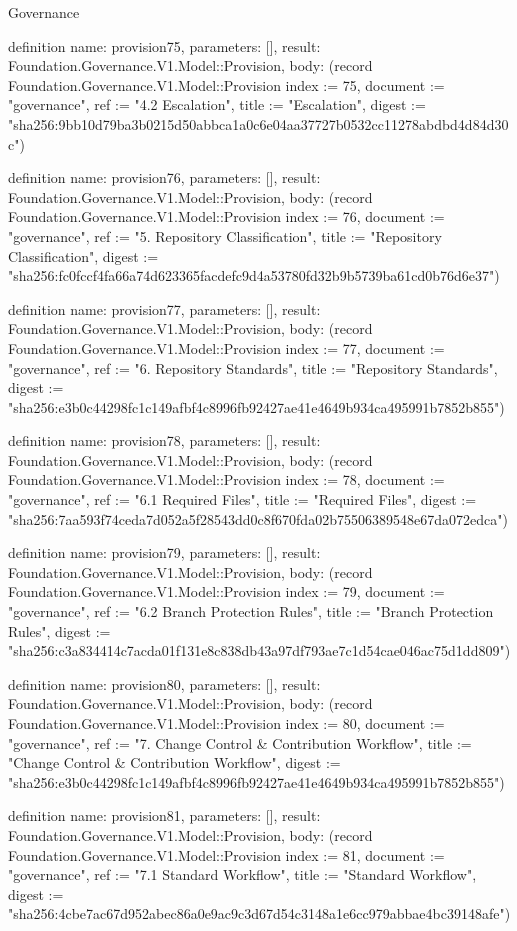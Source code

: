 \begin{lexlean}{Governance}
\begin{semanticmodule}
definition{
  name: provision75,
  parameters: [],
  result: Foundation.Governance.V1.Model::Provision,
  body: (record Foundation.Governance.V1.Model::Provision {index := 75, document := "governance", ref := "4.2 Escalation", title := "Escalation", digest := "sha256:9bb10d79ba3b0215d50abbca1a0c6e04aa37727b0532cc11278abdbd4d84d30c"})
}

definition{
  name: provision76,
  parameters: [],
  result: Foundation.Governance.V1.Model::Provision,
  body: (record Foundation.Governance.V1.Model::Provision {index := 76, document := "governance", ref := "5. Repository Classification", title := "Repository Classification", digest := "sha256:fc0fccf4fa66a74d623365facdefc9d4a53780fd32b9b5739ba61cd0b76d6e37"})
}

definition{
  name: provision77,
  parameters: [],
  result: Foundation.Governance.V1.Model::Provision,
  body: (record Foundation.Governance.V1.Model::Provision {index := 77, document := "governance", ref := "6. Repository Standards", title := "Repository Standards", digest := "sha256:e3b0c44298fc1c149afbf4c8996fb92427ae41e4649b934ca495991b7852b855"})
}

definition{
  name: provision78,
  parameters: [],
  result: Foundation.Governance.V1.Model::Provision,
  body: (record Foundation.Governance.V1.Model::Provision {index := 78, document := "governance", ref := "6.1 Required Files", title := "Required Files", digest := "sha256:7aa593f74ceda7d052a5f28543dd0c8f670fda02b75506389548e67da072edca"})
}

definition{
  name: provision79,
  parameters: [],
  result: Foundation.Governance.V1.Model::Provision,
  body: (record Foundation.Governance.V1.Model::Provision {index := 79, document := "governance", ref := "6.2 Branch Protection Rules", title := "Branch Protection Rules", digest := "sha256:c3a834414c7acda01f131e8c838db43a97df793ae7c1d54cae046ac75d1dd809"})
}

definition{
  name: provision80,
  parameters: [],
  result: Foundation.Governance.V1.Model::Provision,
  body: (record Foundation.Governance.V1.Model::Provision {index := 80, document := "governance", ref := "7. Change Control & Contribution Workflow", title := "Change Control & Contribution Workflow", digest := "sha256:e3b0c44298fc1c149afbf4c8996fb92427ae41e4649b934ca495991b7852b855"})
}

definition{
  name: provision81,
  parameters: [],
  result: Foundation.Governance.V1.Model::Provision,
  body: (record Foundation.Governance.V1.Model::Provision {index := 81, document := "governance", ref := "7.1 Standard Workflow", title := "Standard Workflow", digest := "sha256:4cbe7ac67d952abec86a0e9ac9c3d67d54c3148a1e6cc979abbae4bc39148afe"})
}


\end{semanticmodule}
\end{lexlean}

